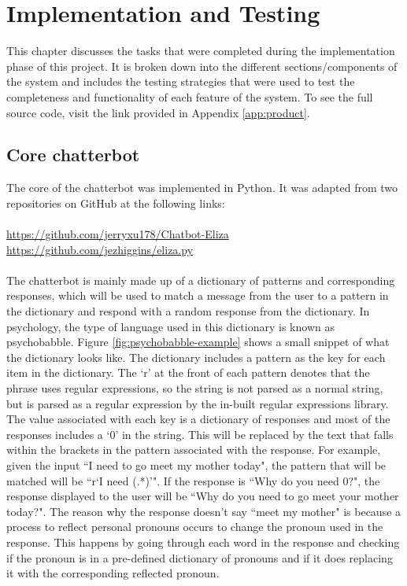%
%
\chapter{Implementation and Testing}
This chapter discusses the tasks that were completed during the implementation phase of this project. It is broken down into the different sections/components of the system and includes the testing strategies that were used to test the completeness and functionality of each feature of the system. To see the full source code, visit the link provided in Appendix \ref{app:product}.
\section{Core chatterbot}
The core of the chatterbot was implemented in Python. It was adapted from two repositories on GitHub at the following links:\\\\
\url{https://github.com/jerryxu178/Chatbot-Eliza}\\
\url{https://github.com/jezhiggins/eliza.py}\\\\
The chatterbot is mainly made up of a dictionary of patterns and corresponding responses, which will be used to match a message from the user to a pattern in the dictionary and respond with a random response from the dictionary. In psychology, the type of language used in this dictionary is known as psychobabble. Figure \ref{fig:psychobabble-example} shows a small snippet of what the dictionary looks like. The dictionary includes a pattern as the key for each item in the dictionary. The `r' at the front of each pattern denotes that the phrase uses regular expressions, so the string is not parsed as a normal string, but is parsed as a regular expression by the in-built regular expressions library. The value associated with each key is a dictionary of responses and most of the responses includes a `{0}' in the string. This will be replaced by the text that falls within the brackets in the pattern associated with the response. For example, given the input ``I need to go meet my mother today", the pattern that will be matched will be ``r`I need (.*)'". If the response is ``Why do you need {0}?", the response displayed to the user will be ``Why do you need to go meet your mother today?". The reason why the response doesn't say ``meet my mother" is because a process to reflect personal pronouns occurs to change the pronoun used in the response. This happens by going through each word in the response and checking if the pronoun is in a pre-defined dictionary of pronouns and if it does replacing it with the corresponding reflected pronoun.

